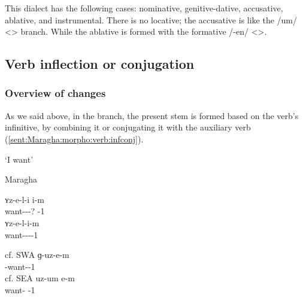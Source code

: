 This dialect has the following cases: nominative, genitive-dative, accusative, ablative, and instrumental. There is no locative; the accusative is like the /um/ <> branch. While the ablative is formed with the formative /-en/ <>. 

\subsection{Verb inflection or conjugation}

\subsubsection{Overview of changes}\label{sec:Maragha:morpho:verb:overview}

 

As we said above, in the  branch, the present stem is formed based on the verb's infinitive, by combining it or conjugating it with the auxiliary verb (\ref{sent:Maragha:morpho:verb:infconj}). 

\begin{exe}
	\ex `I want' \label{sent:Maragha:morpho:verb:infconj} \begin{xlist}
		\ex Maragha
		\begin{xlist}
			\ex \gll ʏz-e-l-i i-m \\
			want-{\thgloss}-{\infgloss}-{\impfcvb}? {\aux}-1{\sg} \\
			\trans {} \label{sent:Maragha:morpho:verb:infconj:base} 
			\ex \gll ʏz-e-l-i-m \\
			want-{\thgloss}-{\infgloss}-{\aux}-1{\sg} \\
			\trans {} \label{sent:Maragha:morpho:verb:infconj:merged} 
		\end{xlist}
		\ex cf. SWA
		\gll ɡ-uz-e-m \\
		{\ind}-want-{\thgloss}-1{\sg} \\
		\trans {}
		\ex cf. SEA
		\gll uz-um e-m \\
		want-{\impfcvb} {\aux}-1{\sg} \\
		\trans {}
	\end{xlist}
	
\end{exe}


\begin{adjarianpage}\label{page:283}\end{adjarianpage}%


